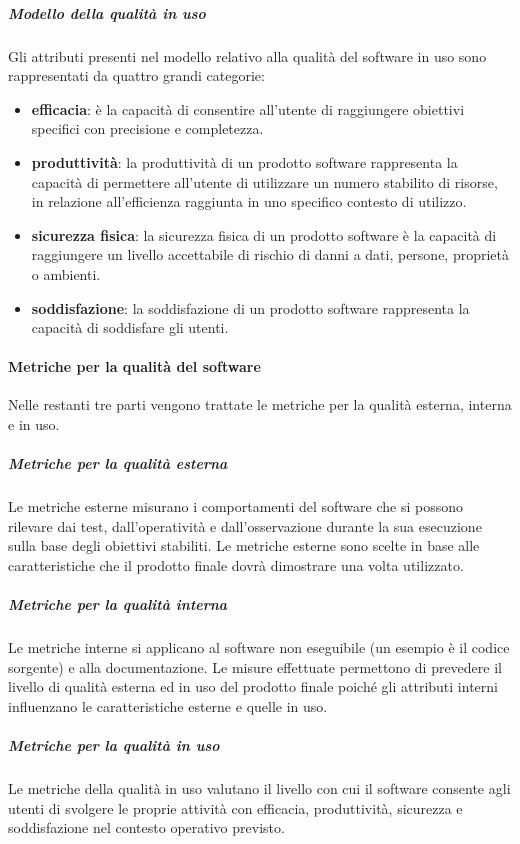 				\subparagraph{Modello della qualità in uso}
				Gli attributi presenti nel modello relativo alla qualità del software in uso sono rappresentati da quattro grandi categorie:
				\begin{itemize}
					\item \textbf{efficacia}: è la capacità di consentire all'utente di raggiungere obiettivi specifici con precisione e completezza.
					\item \textbf{produttività}: la produttività di un prodotto software rappresenta la capacità di permettere all'utente di utilizzare un numero stabilito di risorse, in relazione all'efficienza raggiunta in uno specifico contesto di utilizzo.
					\item \textbf{sicurezza fisica}: la sicurezza fisica di un prodotto software è la capacità di raggiungere un livello accettabile di rischio di danni a dati, persone, proprietà o ambienti.
					\item \textbf{soddisfazione}: la soddisfazione di un prodotto software rappresenta la capacità di soddisfare gli utenti.
				\end{itemize}
			\paragraph{Metriche per la qualità del software}
			Nelle restanti tre parti vengono trattate le metriche per la qualità esterna, interna e in uso.
				\subparagraph{Metriche per la qualità esterna}
				Le metriche esterne misurano i comportamenti del software che si possono rilevare dai test, dall'operatività e dall'osservazione durante la sua esecuzione sulla base degli obiettivi stabiliti. Le metriche esterne sono scelte in base alle caratteristiche che il prodotto finale dovrà dimostrare una volta utilizzato.
				\subparagraph{Metriche per la qualità interna}
				Le metriche interne si applicano al software non eseguibile (un esempio è il codice sorgente) e alla documentazione. Le misure effettuate permettono di prevedere il livello di qualità esterna ed in uso del prodotto finale poiché gli attributi interni influenzano le caratteristiche esterne e quelle in uso.
				\subparagraph{Metriche per la qualità in uso}
				Le metriche della qualità in uso valutano il livello con cui il software consente agli utenti di svolgere le proprie attività con efficacia, produttività, sicurezza e soddisfazione nel contesto operativo previsto.
